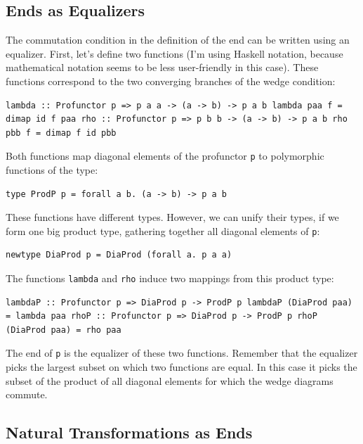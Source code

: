 \subsection{Ends as Equalizers}\label{ends-as-equalizers}

The commutation condition in the definition of the end can be written
using an equalizer. First, let's define two functions (I'm using Haskell
notation, because mathematical notation seems to be less user-friendly
in this case). These functions correspond to the two converging branches
of the wedge condition:

\begin{verbatim}
lambda :: Profunctor p => p a a -> (a -> b) -> p a b lambda paa f = dimap id f paa rho :: Profunctor p => p b b -> (a -> b) -> p a b rho pbb f = dimap f id pbb
\end{verbatim}

Both functions map diagonal elements of the profunctor \texttt{p} to
polymorphic functions of the type:

\begin{verbatim}
type ProdP p = forall a b. (a -> b) -> p a b
\end{verbatim}

These functions have different types. However, we can unify their types,
if we form one big product type, gathering together all diagonal
elements of \texttt{p}:

\begin{verbatim}
newtype DiaProd p = DiaProd (forall a. p a a)
\end{verbatim}

The functions \texttt{lambda} and \texttt{rho} induce two mappings from
this product type:

\begin{verbatim}
lambdaP :: Profunctor p => DiaProd p -> ProdP p lambdaP (DiaProd paa) = lambda paa rhoP :: Profunctor p => DiaProd p -> ProdP p rhoP (DiaProd paa) = rho paa
\end{verbatim}

The end of \texttt{p} is the equalizer of these two functions. Remember
that the equalizer picks the largest subset on which two functions are
equal. In this case it picks the subset of the product of all diagonal
elements for which the wedge diagrams commute.

\subsection{Natural Transformations as
Ends}\label{natural-transformations-as-ends}


